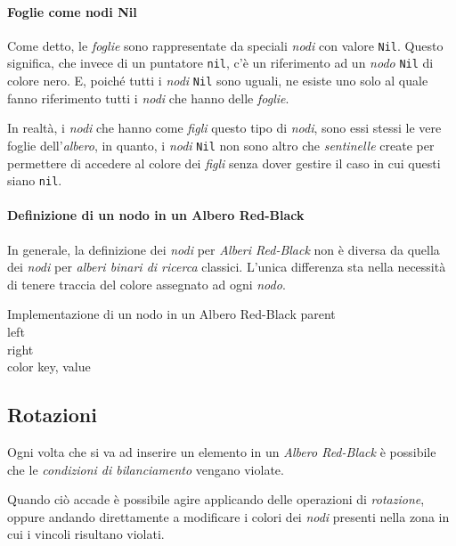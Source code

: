 \paragraph{Foglie come nodi Nil}
Come detto, le \emph{foglie} sono rappresentate da speciali \emph{nodi} con
valore \texttt{Nil}. Questo significa, che invece di un puntatore \texttt{nil},
c'è un riferimento ad un \emph{nodo} \texttt{Nil} di colore nero. E, poiché
tutti i \emph{nodi} \texttt{Nil} sono uguali, ne esiste uno solo al quale fanno
riferimento tutti i \emph{nodi} che hanno delle \emph{foglie}.

In realtà, i \emph{nodi} che hanno come \emph{figli} questo tipo di \emph{nodi},
sono essi stessi le vere foglie dell'\emph{albero}, in quanto, i \emph{nodi}
\texttt{Nil} non sono altro che \emph{sentinelle} create per permettere di
accedere al colore dei \emph{figli} senza dover gestire il caso in cui questi
siano \texttt{nil}.

\paragraph{Definizione di un nodo in un Albero Red-Black}
In generale, la definizione dei \emph{nodi} per \emph{Alberi Red-Black} non è
diversa da quella dei \emph{nodi} per \emph{alberi binari di ricerca} classici.
L'unica differenza sta nella necessità di tenere traccia del colore assegnato ad
ogni \emph{nodo}.

\begin{code}{Implementazione di un nodo in un Albero Red-Black}
     parent\\
     left\\
     right\\
     color\hfill{}
     key, value
\end{code}

\subsection{Rotazioni}
Ogni volta che si va ad inserire un elemento in un \emph{Albero Red-Black} è
possibile che le \emph{condizioni di bilanciamento} vengano violate.

Quando ciò accade è possibile agire applicando delle operazioni di
\emph{rotazione}, oppure andando direttamente a modificare i colori dei \emph{nodi}
presenti nella zona in cui i vincoli risultano violati.

